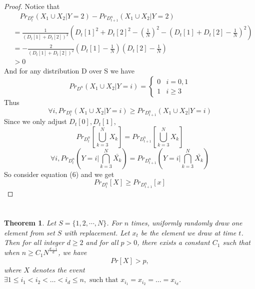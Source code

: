 \documentclass{article}
\newtheorem{theorem}{Theorem}
\begin{document}
\begin{spacing}{1.1}
\begin{proof}
        Notice that
        \begin{equation}
            \begin{aligned}
                &\quad Pr_{D_t^n}(X_1\cup X_2 | Y = 2) - Pr_{D_{t+1}^n}(X_1\cup X_2 | Y = 2)\\
                &= \frac{1}{(D_t[1] + D_t[2])^2}(D_t[1]^2 + D_t[2]^2 - (\frac{1}{N})^2 - (D_t[1] + D_t[2] - \frac{1}{N})^2)\\
                &= -\frac{2}{(D_t[1] + D_t[2])^2}(D_t[1] - \frac{1}{N})(D_t[2] - \frac{1}{N})\\
                &> 0
            \end{aligned}
        \end{equation}
        And for any distribution D over S we have
        \begin{equation}
            Pr_{D^n}(X_1\cup X_2 | Y = i) =
            \begin{cases}
                0 & i = 0, 1\\
                1 & i \geq 3
            \end{cases}
        \end{equation}
        Thus
        $$\forall i, Pr_{D_t^n}(X_1\cup X_2 | Y = i) \geq Pr_{D_{t+1}^n}(X_1\cup X_2 | Y = i)$$
        Since we only adjust $D_t[0], D_t[1]$,
        $$Pr_{D_t^n}[\bigcup_{k = 3}^N X_k] = Pr_{D_{t+1}^n}[\bigcup_{k = 3}^N X_k]$$
        $$\forall i, Pr_{D_t^n}(Y = i | \bigcap_{k = 3}^N \bar{X_k}) = Pr_{D_{t+1}^n}(Y = i | \bigcap_{k = 3}^N \bar{X_k})$$
        So consider equation (6) and we get
        $$Pr_{D_t^n}[X] \geq Pr_{D_{t+1}^n}[x]$$
    \end{proof}
    
    \section{}

    \subsection{}

    \begin{theorem}

    Let $S = \{1, 2, \cdots, N\}$. For $n$ times, uniformly randomly draw one element from set $S$ with replacement. Let $x_t$ be the element we draw at time $t$. Then for all integer $d\geq 2$ and for all $p > 0$, there exists a constant $C_1$ such that when $n \geq C_1 {N}^{\frac{d-1}{d}}$, we have
    $$Pr[X] > p,$$
    where $X$ denotes the event $\exists 1\leq i_1< i_2<\dots<i_d \leq n, \text{ such that } x_{i_1} = x_{i_2}=\dots=x_{i_d}$.


\end{theorem}
\end{spacing}
\end{document}
